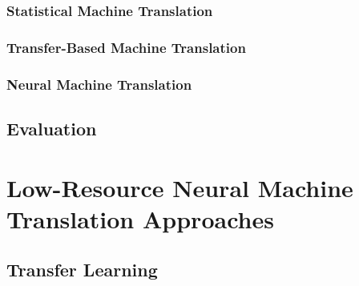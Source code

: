 \subsubsection{Statistical Machine Translation}

\subsubsection{Transfer-Based Machine Translation}


\subsubsection{Neural Machine Translation}

\subsection{Evaluation}


\section{Low-Resource Neural Machine Translation Approaches}
\label{NMT}

\subsection{Transfer Learning}

